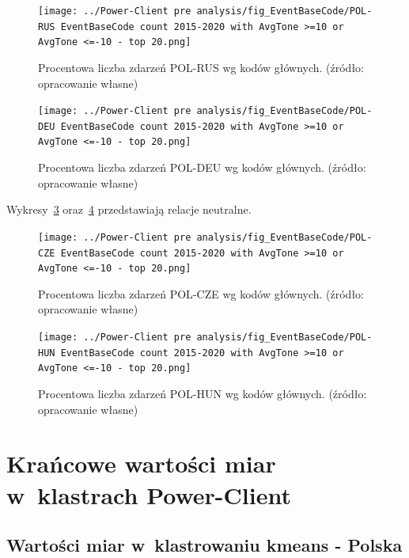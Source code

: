 \documentclass[11pt]{report}
\begin{document}
    \begin{figure}[tp]
        \centering
        \texttt{[image: ../Power-Client pre analysis/fig\_EventBaseCode/POL-RUS EventBaseCode count 2015-2020 with AvgTone >=10 or AvgTone <=-10 - top 20.png]}
        \caption{Procentowa liczba zdarzeń POL-RUS wg kodów głównych. (źródło: opracowanie własne)}
        \label{fig:Power-Client:EBC:AvgToone10:POL-RUS}
    \end{figure}

    \begin{figure}[tp]
        \centering
        \texttt{[image: ../Power-Client pre analysis/fig\_EventBaseCode/POL-DEU EventBaseCode count 2015-2020 with AvgTone >=10 or AvgTone <=-10 - top 20.png]}
        \caption{Procentowa liczba zdarzeń POL-DEU wg kodów głównych. (źródło: opracowanie własne)}
        \label{fig:Power-Client:EBC:AvgToone10:POL-DEU}
    \end{figure}

    Wykresy~\ref{fig:Power-Client:EBC:AvgToone10:POL-CZE} oraz~\ref{fig:Power-Client:EBC:AvgToone10:POL-HUN} przedstawiają relacje neutralne.

    \begin{figure}[tp]
        \centering
        \texttt{[image: ../Power-Client pre analysis/fig\_EventBaseCode/POL-CZE EventBaseCode count 2015-2020 with AvgTone >=10 or AvgTone <=-10 - top 20.png]}
        \caption{Procentowa liczba zdarzeń POL-CZE wg kodów głównych. (źródło: opracowanie własne)}
        \label{fig:Power-Client:EBC:AvgToone10:POL-CZE}
    \end{figure}

    \begin{figure}[tp]
        \centering
        \texttt{[image: ../Power-Client pre analysis/fig\_EventBaseCode/POL-HUN EventBaseCode count 2015-2020 with AvgTone >=10 or AvgTone <=-10 - top 20.png]}
        \caption{Procentowa liczba zdarzeń POL-HUN wg kodów głównych. (źródło: opracowanie własne)}
        \label{fig:Power-Client:EBC:AvgToone10:POL-HUN}
    \end{figure}


    \section{Krańcowe wartości miar w~klastrach Power-Client}

    \subsection{Wartości miar w~klastrowaniu kmeans - Polska}\label{subsec:wartości-miar-w-klastrowaniu-kmeans---polska}
\end{document}
